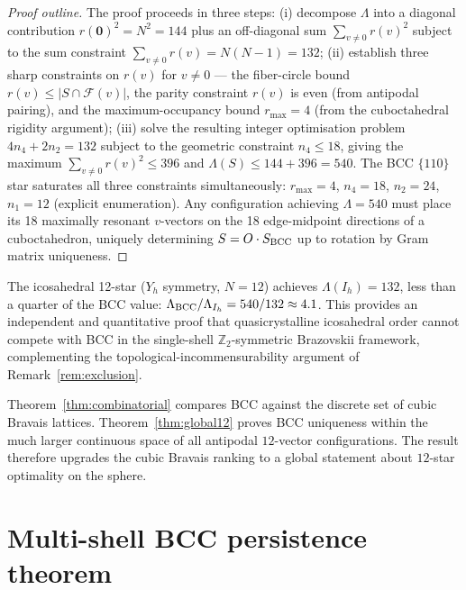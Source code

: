 \begin{proof}[Proof outline]
The proof proceeds in three steps: (i) decompose $\Lambda$ into a
diagonal contribution $r(\mathbf{0})^2 = N^2 = 144$ plus an
off-diagonal sum $\sum_{v \neq 0} r(v)^2$ subject to the sum
constraint $\sum_{v\neq 0} r(v) = N(N-1) = 132$; (ii) establish three
sharp constraints on $r(v)$ for $v \neq 0$ — the fiber-circle bound
$r(v) \leq |S \cap \mathcal{F}(v)|$, the parity constraint $r(v)$ is
even (from antipodal pairing), and the maximum-occupancy bound
$r_{\max} = 4$ (from the cuboctahedral rigidity argument); (iii)
solve the resulting integer optimisation problem
$4 n_4 + 2 n_2 = 132$ subject to the geometric constraint $n_4 \leq
18$, giving the maximum $\sum_{v \neq 0} r(v)^2 \leq 396$ and
$\Lambda(S) \leq 144 + 396 = 540$. The BCC $\{110\}$ star saturates
all three constraints simultaneously: $r_{\max} = 4$, $n_4 = 18$,
$n_2 = 24$, $n_1 = 12$ (explicit enumeration). Any configuration
achieving $\Lambda = 540$ must place its 18 maximally resonant
$v$-vectors on the 18 edge-midpoint directions of a cuboctahedron,
uniquely determining $S = O \cdot S_{\rm BCC}$ up to rotation by Gram
matrix uniqueness.
\end{proof}

\begin{remark}
\label{rem:icosahedral}
The icosahedral 12-star ($Y_h$ symmetry, $N = 12$) achieves
$\Lambda(I_h) = 132$, less than a quarter of the BCC value:
$\Lambda_{\rm BCC} / \Lambda_{I_h} = 540/132 \approx 4.1$. This
provides an independent and quantitative proof that
quasicrystalline icosahedral order cannot compete with BCC in the
single-shell $\mathbb{Z}_2$-symmetric Brazovskii framework,
complementing the topological-incommensurability argument of
Remark~\ref{rem:exclusion}.
\end{remark}

\begin{remark}
Theorem~\ref{thm:combinatorial} compares BCC against the discrete set
of cubic Bravais lattices. Theorem~\ref{thm:global12} proves BCC
uniqueness within the much larger continuous space of all antipodal
$12$-vector configurations. The result therefore upgrades the cubic
Bravais ranking to a global statement about $12$-star optimality on
the sphere.
\end{remark}

\section{Multi-shell BCC persistence
theorem}\label{sec:multishell}

